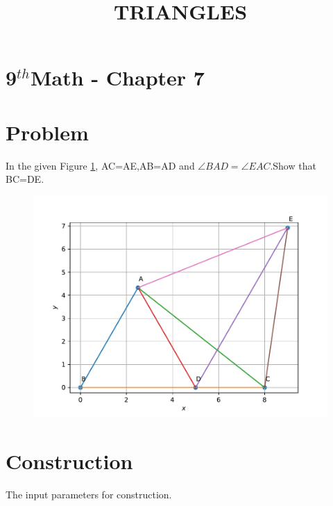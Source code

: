 \documentclass[10pt]{article}
\begin{document}
\begin{center}
\title{\textbf{TRIANGLES}}
\date{\vspace{-5ex}}
\maketitle
\end{center}
\section*{9$^{th}$Math - Chapter 7}
\section*{Problem}
In the given Figure \ref{fig:1}, AC=AE,AB=AD and $\angle BAD=\angle EAC$.Show that BC=DE.
\begin{figure}[!h]
	\begin{center}
	\includegraphics[width=\columnwidth]{./figs/fig.pdf}
	\end{center}
\caption{}
\label{fig:1}
\end{figure}
\section*{Construction}
The input parameters for construction.\\
\end{document}
